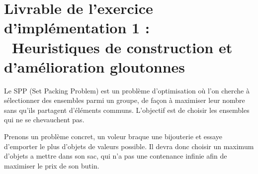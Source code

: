 
\section*{Livrable de l'exercice d'implémentation  1 : \\ Heuristiques de construction et d'amélioration gloutonnes}

%
%

\vspace{5mm}
\noindent
{}
\vspace{2mm}

\noindent
Le SPP (Set Packing Problem) est un problème d'optimisation où l'on cherche à sélectionner des ensembles parmi un groupe, de façon à maximiser leur nombre sans qu'ils partagent d'éléments communs. L'objectif est de choisir les ensembles qui ne se chevauchent pas.

\vspace{0,5mm}
\noindent
Prenons un problème concret, un voleur braque une bijouterie et essaye d'emporter le plus d'objets de valeurs possible. Il devra donc choisir un maximum d'objets a mettre dans son sac, qui n'a pas une contenance infinie afin de maximiser le prix de son butin.



%
%

\vspace{5mm}
\noindent
{}
\vspace{2mm}

